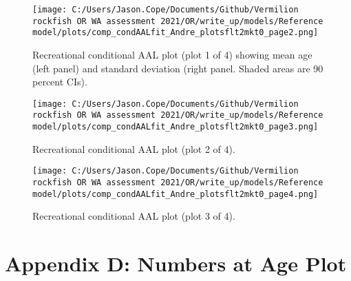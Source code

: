 \documentclass[11pt,
  english,
  a4paper,
]{article}
\begin{document}
\tagmcend\tagstructend


\begin{figure}
\centering
\texttt{[image: C:/Users/Jason.Cope/Documents/Github/Vermilion rockfish OR WA assessment 2021/OR/write\_up/models/Reference model/plots/comp\_condAALfit\_Andre\_plotsflt2mkt0\_page2.png]}
\caption{Recreational conditional AAL plot (plot 1 of 4) showing mean age (left panel) and standard deviation (right panel. Shaded areas are 90 percent CIs).\label{fig:comp_condAALfit_Andre_plotsflt2mkt0_page2}}
\end{figure}

\tagmcend\tagstructend


\begin{figure}
\centering
\texttt{[image: C:/Users/Jason.Cope/Documents/Github/Vermilion rockfish OR WA assessment 2021/OR/write\_up/models/Reference model/plots/comp\_condAALfit\_Andre\_plotsflt2mkt0\_page3.png]}
\caption{Recreational conditional AAL plot (plot 2 of 4).\label{fig:comp_condAALfit_Andre_plotsflt2mkt0_page3}}
\end{figure}

\tagmcend\tagstructend


\begin{figure}
\centering
\texttt{[image: C:/Users/Jason.Cope/Documents/Github/Vermilion rockfish OR WA assessment 2021/OR/write\_up/models/Reference model/plots/comp\_condAALfit\_Andre\_plotsflt2mkt0\_page4.png]}
\caption{Recreational conditional AAL plot (plot 3 of 4).\label{fig:comp_condAALfit_Andre_plotsflt2mkt0_page4}}
\end{figure}

\tagmcend\tagstructend

\clearpage


\hypertarget{app-d}{%
\section{Appendix D: Numbers at Age Plot}\label{app-d}}
\end{document}
